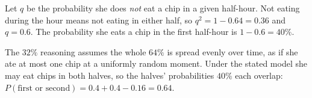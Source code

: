 Let $q$ be the probability she does \emph{not} eat a chip in a given half-hour. Not eating during the hour means not eating in either half, so $q^2=1-0.64=0.36$ and $q=0.6$. The probability she eats a chip in the first half-hour is $1-0.6=\boxed{40\%}$.

The $32\%$ reasoning assumes the whole $64\%$ is spread evenly over time, as if she ate at most one chip at a uniformly random moment. Under the stated model she may eat chips in both halves, so the halves' probabilities $40\%$ each overlap: $P(\text{first or second})=0.4+0.4-0.16=0.64$.
